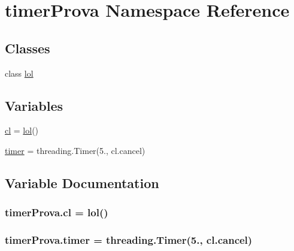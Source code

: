 \hypertarget{namespacetimerProva}{}\section{timer\+Prova Namespace Reference}
\label{namespacetimerProva}
\subsection*{Classes}
\begin{DoxyCompactItemize}
\item 
class \hyperlink{classtimerProva_1_1lol}{lol}
\end{DoxyCompactItemize}
\subsection*{Variables}
\begin{DoxyCompactItemize}
\item 
\hyperlink{namespacetimerProva_a07d439c7682f065e428d5775a6c26fd4}{cl} = \hyperlink{classtimerProva_1_1lol}{lol}()
\item 
\hyperlink{namespacetimerProva_a90c548f7f2d9551bd82d3ed7c4828740}{timer} = threading.\+Timer(5., cl.\+cancel)
\end{DoxyCompactItemize}


\subsection{Variable Documentation}
\subsubsection[{\texorpdfstring{cl}{cl}}]{\setlength{\rightskip}{0pt plus 5cm}timer\+Prova.\+cl = {\bf lol}()}\hypertarget{namespacetimerProva_a07d439c7682f065e428d5775a6c26fd4}{}\label{namespacetimerProva_a07d439c7682f065e428d5775a6c26fd4}
\subsubsection[{\texorpdfstring{timer}{timer}}]{\setlength{\rightskip}{0pt plus 5cm}timer\+Prova.\+timer = threading.\+Timer(5., cl.\+cancel)}\hypertarget{namespacetimerProva_a90c548f7f2d9551bd82d3ed7c4828740}{}\label{namespacetimerProva_a90c548f7f2d9551bd82d3ed7c4828740}
